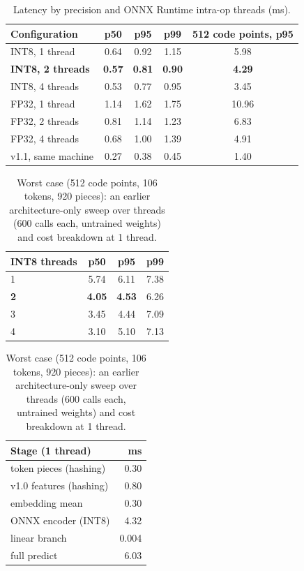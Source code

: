 \documentclass[11pt,a4paper]{article}
\theoremstyle{remark}
\begin{document}
\begin{table}[h]
\centering\small
\caption{Latency by precision and ONNX Runtime intra-op threads (ms).}
\label{tab:latency}
\begin{tabular}{@{}l ccc c@{}}
\toprule
Configuration & p50 & p95 & p99 & 512 code points, p95 \\
\midrule
INT8, 1 thread  & 0.64 & 0.92 & 1.15 & 5.98 \\
\textbf{INT8, 2 threads} & \textbf{0.57} & \textbf{0.81} & \textbf{0.90} & \textbf{4.29} \\
INT8, 4 threads & 0.53 & 0.77 & 0.95 & 3.45 \\
FP32, 1 thread  & 1.14 & 1.62 & 1.75 & 10.96 \\
FP32, 2 threads & 0.81 & 1.14 & 1.23 & 6.83 \\
FP32, 4 threads & 0.68 & 1.00 & 1.39 & 4.91 \\
\midrule
v1.1, same machine & 0.27 & 0.38 & 0.45 & 1.40 \\
\bottomrule
\end{tabular}
\end{table}

\begin{table}[h]
\centering\small
\caption{Worst case (512 code points, 106 tokens, 920 pieces): an earlier architecture-only sweep over threads (600 calls each, untrained weights) and cost breakdown at 1 thread.}
\label{tab:sweep}
\begin{tabular}{@{}l ccc@{}}
\toprule
INT8 threads & p50 & p95 & p99 \\
\midrule
1 & 5.74 & 6.11 & 7.38 \\
\textbf{2} & \textbf{4.05} & \textbf{4.53} & 6.26 \\
3 & 3.45 & 4.44 & 7.09 \\
4 & 3.10 & 5.10 & 7.13 \\
\bottomrule
\end{tabular}
\hspace{1.5em}
\begin{tabular}{@{}l r@{}}
\toprule
Stage (1 thread) & ms \\
\midrule
token pieces (hashing) & 0.30 \\
v1.0 features (hashing) & 0.80 \\
embedding mean & 0.30 \\
ONNX encoder (INT8) & 4.32 \\
linear branch & 0.004 \\
\midrule
full predict & 6.03 \\
\bottomrule
\end{tabular}
\end{table}
\end{document}

